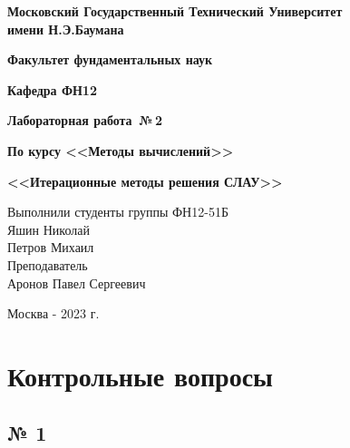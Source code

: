 \documentclass[a4paper, 14pt]{article}
\begin{document}
\thispagestyle{empty}
\begin{center}

\vspace{4ex}

\textbf{Московский Государственный Технический Университет \\ имени Н.Э.Баумана}


\vspace{2ex}

\textbf{Факультет фундаментальных наук}

\vspace{2ex}

\textbf{Кафедра ФН12}

\end{center}
\vspace{10ex}

\begin{center}
	\vspace{4.5ex}
	\textbf{Лабораторная работа \,№\,2}
	
	\vspace{1ex}
	
	\textbf{По курсу <<Методы вычислений>>}
	
	
	\vspace{1ex}
	
  \textbf{<<Итерационные методы решения СЛАУ>>}\\


\end{center}
\begin{flushright}
    \vspace{6cm}
	\noindent
        
	Выполнили студенты группы ФН12-51Б
	\\
    Яшин Николай\\
    Петров Михаил\\
    Преподаватель\\ Аронов Павел Сергеевич
\end{flushright}

\vfill

\begin{center}
    Москва - 2023 г.
\end{center}

\newpage

\section*{Контрольные вопросы}

\subsection*{№ 1}
\end{document}
